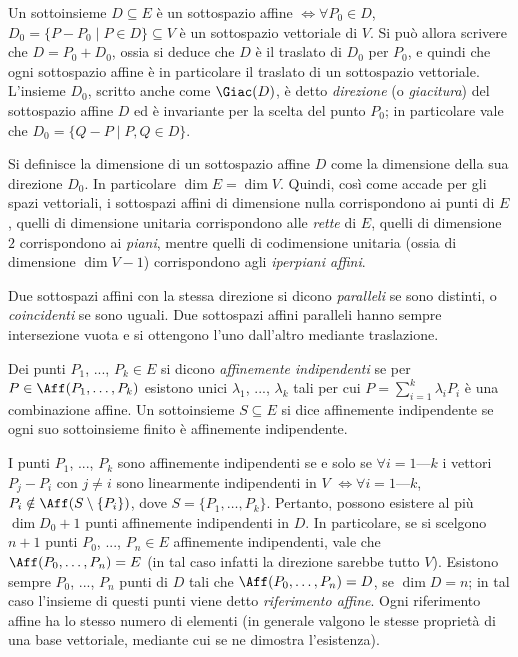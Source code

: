 \documentclass[10pt,landscape]{article}
\begin{document}
\begin{multicols}{3}
        Un sottoinsieme $D \subseteq E$ è un sottospazio affine $\iff \forall P_0 \in D$,
        $D_0=\{P-P_0 \mid P\in D\}\subseteq V$ è un sottospazio vettoriale di $V$.
        Si può allora scrivere che $D=P_0+D_0$, ossia si deduce che $D$ è il traslato di $D_0$ per $P_0$, e quindi
        che ogni sottospazio affine è in particolare il traslato
        di un sottospazio vettoriale.
        L'insieme $D_0$, scritto anche come $\Giac(D)$, è detto \textit{direzione} (o \textit{giacitura}) del sottospazio affine $D$ ed è invariante per la scelta
        del punto $P_0$; in particolare vale che $D_0 = \{ Q - P \mid P, Q \in D \}$.

        Si definisce la dimensione di un sottospazio affine $D$ come la dimensione della sua direzione $D_0$. In particolare $\dim E = \dim V$. Quindi, così come accade per gli spazi vettoriali, i sottospazi affini di dimensione nulla corrispondono ai punti di $E$, quelli di dimensione unitaria corrispondono alle \textit{rette} di $E$, quelli di dimensione $2$ corrispondono ai \textit{piani}, mentre quelli di codimensione unitaria (ossia di dimensione $\dim V - 1$) corrispondono agli \textit{iperpiani affini}.

        Due sottospazi affini con la stessa direzione si
        dicono \textit{paralleli} se sono distinti, o \textit{coincidenti} se sono uguali. Due sottospazi
        affini paralleli hanno sempre intersezione vuota e si ottengono l'uno dall'altro mediante traslazione.

	    Dei punti $P_1$, ..., $P_k \in E$ si dicono \textit{affinemente indipendenti} se per
	    $P \in \Aff(P_1, \ldots, P_k)$ esistono unici
	    $\lambda_1$, ..., $\lambda_k$ tali per cui
	    $P = \sum_{i=1}^k \lambda_i P_i$ è una combinazione
	    affine. Un sottoinsieme $S \subseteq E$ si dice affinemente indipendente se ogni suo sottoinsieme finito è affinemente indipendente.

        I punti $P_1$, ..., $P_k$ sono affinemente indipendenti se e solo se $\forall i=1\text{---}k$ i vettori $P_j-P_i$ con $j \neq i$ sono linearmente indipendenti in $V$ $\iff \forall i=1\text{---}k$, $P_i \notin \Aff(S \setminus \{P_i\})$,
        dove $S = \{P_1, \ldots, P_k\}$. Pertanto, possono
        esistere al più $\dim D_0 + 1$ punti affinemente
        indipendenti in $D$. In particolare, se si scelgono
        $n+1$ punti $P_0$, ..., $P_n \in E$ affinemente
        indipendenti, vale che $\Aff(P_0, \ldots, P_n) = E$ (in tal caso infatti la direzione sarebbe tutto $V$).
        Esistono sempre $P_0$, ..., $P_n$ punti di $D$ tali
        che $\Aff(P_0, \ldots, P_n) = D$, se $\dim D = n$;
        in tal caso l'insieme di questi punti viene detto
        \textit{riferimento affine}. Ogni riferimento affine ha
        lo stesso numero di elementi (in generale valgono
        le stesse proprietà di una base vettoriale, mediante
        cui se ne dimostra l'esistenza).


\end{multicols}
\end{document}
